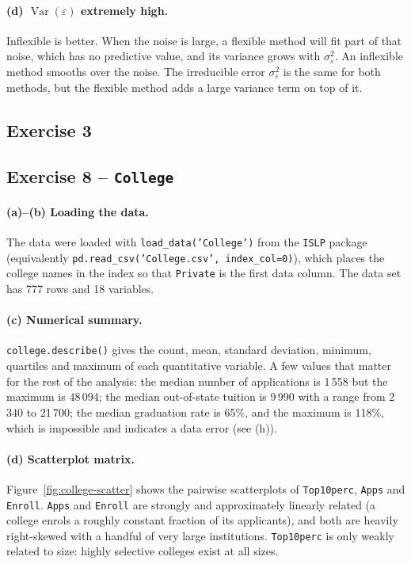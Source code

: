 \documentclass[11pt]{article}
\begin{document}
\paragraph{(d) $\operatorname{Var}(\varepsilon)$ extremely high.}
Inflexible is better. When the noise is large, a flexible method will fit part of that noise, which has no predictive value, and its variance grows with $\sigma_\varepsilon^2$. An inflexible method smooths over the noise. The irreducible error $\sigma_\varepsilon^2$ is the same for both methods, but the flexible method adds a large variance term on top of it.

\subsection*{Exercise 3}

\subsection*{Exercise 8 -- \texttt{College}}

\paragraph{(a)--(b) Loading the data.}
The data were loaded with \texttt{load\_data('College')} from the \texttt{ISLP} package (equivalently \texttt{pd.read\_csv('College.csv', index\_col=0)}), which places the college names in the index so that \texttt{Private} is the first data column. The data set has 777 rows and 18 variables.

\paragraph{(c) Numerical summary.}
\texttt{college.describe()} gives the count, mean, standard deviation, minimum, quartiles and maximum of each quantitative variable. A few values that matter for the rest of the analysis: the median number of applications is 1\,558 but the maximum is 48\,094; the median out-of-state tuition is 9\,990 with a range from 2\,340 to 21\,700; the median graduation rate is 65\%, and the maximum is 118\%, which is impossible and indicates a data error (see (h)).

\paragraph{(d) Scatterplot matrix.}
Figure~\ref{fig:college-scatter} shows the pairwise scatterplots of \texttt{Top10perc}, \texttt{Apps} and \texttt{Enroll}. \texttt{Apps} and \texttt{Enroll} are strongly and approximately linearly related (a college enrols a roughly constant fraction of its applicants), and both are heavily right-skewed with a handful of very large institutions. \texttt{Top10perc} is only weakly related to size: highly selective colleges exist at all sizes.
\end{document}
